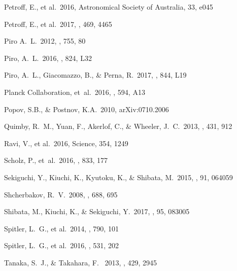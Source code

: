\documentclass[]{pasj01}
\begin{document}
\begin{thebibliography}{10}
{Petroff}, E., et al.\ 2016, Astronomical Society of Australia, 33, e045

{Petroff}, E., et al.\ 2017, \mnras, 469, 4465

{Piro} A.~L.\ 2012, \apj, 755, 80

{Piro}, A.~L.\ 2016, \aplett, 824, L32

Piro, A.~L., Giacomazzo, B., \& Perna, R.\ 2017, \apj, 844, L19

{Planck Collaboration}, et~al.\ 2016, \aap, 594, A13

Popov, S.B., \& Postnov, K.A.\ 2010, arXiv:0710.2006 

{Quimby}, R.~M., {Yuan}, F., {Akerlof}, C., \& {Wheeler}, J.~C.\ 2013, \mnras, 431, 912

{Ravi}, V., et al.\ 2016, Science, 354, 1249


Scholz, P., et~al.\ 2016, \apj, 833, 177

Sekiguchi, Y., Kiuchi, K., Kyutoku, K., \& Shibata, M.\ 2015, \prd, 91, 064059

{Shcherbakov}, R.~V.\ 2008, \apj, 688, 695

{Shibata}, M., {Kiuchi}, K., \& {Sekiguchi}, Y.\ 2017, \prd, 95, 083005


{Spitler}, L.~G., et al.\ 2014, \apj, 790, 101

Spitler, L.~G., et al.\ 2016, \nat, 531, 202

{Tanaka}, S.~J., \& {Takahara}, F. \ 2013, \mnras, 429, 2945


\end{thebibliography}
\end{document}
